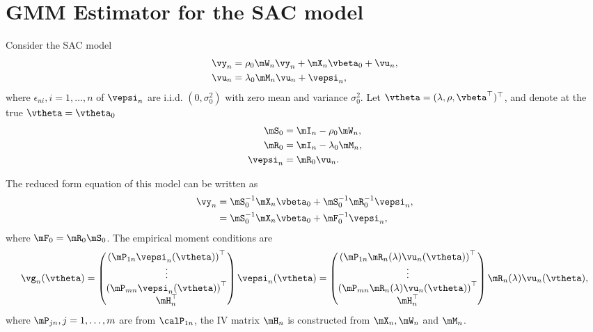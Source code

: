 \documentclass[english,12pt]{book}\usepackage[]{graphicx}\usepackage[]{xcolor}
\begin{document}
\section{GMM Estimator for the SAC model}


Consider the SAC model
\begin{equation*}
\begin{aligned}
  \vy_n & = \rho_0\mW_n\vy_n + \mX_n\vbeta_0 + \vu_n, \\
  \vu_n & = \lambda_0\mM_n\vu_n + \vepsi_n,
\end{aligned}
\end{equation*}
%
where $\epsilon_{ni}, i = 1, \ldots, n$ of $\vepsi_n$ are i.i.d. $(0, \sigma^2_0)$ with zero mean and variance $\sigma_0^2$. Let $\vtheta = (\lambda, \rho, \vbeta^\top)^\top$, and denote at the true $\vtheta = \vtheta_0$
\begin{equation*}
\begin{aligned}
\mS_0 & = \mI_n - \rho_0\mW_n, \\
\mR_0 & = \mI_n - \lambda_0 \mM_n, \\
\vepsi_n & = \mR_0\vu_n.
\end{aligned}
\end{equation*}

The reduced form equation of this model can be written as
\begin{equation*}
\begin{aligned}
 \vy_n & = \mS_0^{-1}\mX_n\vbeta_0 + \mS_0^{-1}\mR_0^{-1}\vepsi_n,  \\
       & =  \mS_0^{-1}\mX_n\vbeta_0 + \mF_0^{-1}\vepsi_n,
\end{aligned}
\end{equation*}
%
where $\mF_0 = \mR_0\mS_0$. The empirical moment conditions are
\begin{equation*}
\vg_n(\vtheta) = \begin{pmatrix}
                  \left(\mP_{1n}\vepsi_n(\vtheta)\right)^\top\\
                   \vdots \\
                   \left(\mP_{mn}\vepsi_n(\vtheta)\right)^\top \\
                   \mH_n^\top
                 \end{pmatrix}\vepsi_n(\vtheta)
                 =
                 \begin{pmatrix}
                  \left(\mP_{1n}\mR_n(\lambda)\vu_n(\vtheta)\right)^\top\\
                   \vdots \\
                   \left(\mP_{mn}\mR_n(\lambda)\vu_n(\vtheta)\right)^\top \\
                   \mH_n^\top
                 \end{pmatrix}\mR_n(\lambda)\vu_n(\vtheta),
\end{equation*}
%
where $\mP_{jn}, j = 1, \ldots, m$ are from $\calP_{1n}$, the IV matrix $\mH_n$ is constructed from $\mX_n, \mW_n$ and $\mM_n$.
\end{document}
